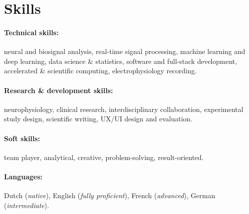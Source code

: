 \documentclass{resume}
\begin{document}
\section{Skills}
\paragraph{Technical skills:}
neural and biosignal analysis,
real-time signal processing,
machine learning and deep learning,
data science \& statistics,
software and full-stack development,
accelerated \& scientific computing, electrophysiology recording.

\paragraph{Research \& development skills:} neurophysiology, clinical research, interdisciplinary
collaboration, experimental study design, scientific writing, UX/UI design and evaluation.

\paragraph{Soft skills:} team player, analytical, creative, problem-solving,
result-oriented.

\paragraph{Languages:} Dutch (\emph{native}), English (\emph{fully proficient}), French
(\emph{advanced}), German (\emph{intermediate}).

\pagebreak
\end{document}
